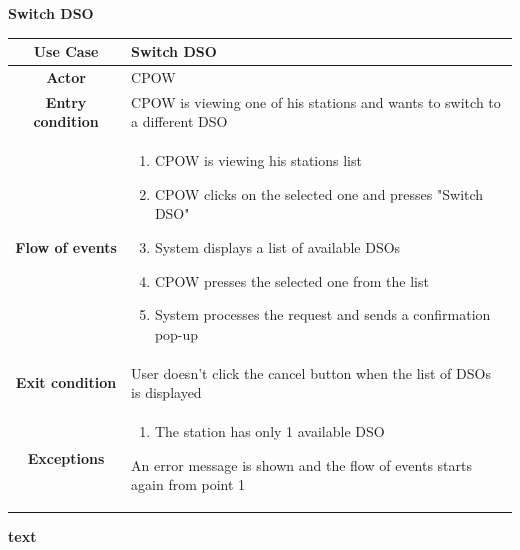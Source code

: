 \documentclass[table, 12pt]{article} %
\begin{document}
\begin{itemize}
             \begin{table}[H]
                \item[] \textbf{Switch DSO}
                \item[]
                \centering
                \begin{tabular}{|c |m{}|}
                    \hline
                    \textbf{Use Case} & Switch DSO\\ \hline
                    \textbf{Actor} & CPOW\\ \hline
                    \textbf{Entry condition} & CPOW is viewing one of his stations and wants to switch to a different DSO\\  \hline
                    \textbf{Flow of events} & \begin{enumerate}
                                                \item CPOW is viewing his stations list
                                                \item CPOW clicks on the selected one and presses "Switch DSO"
                                                \item System displays a list of available DSOs
                                                \item CPOW presses the selected one from the list
                                                \item System processes the request and sends a confirmation pop-up
                                            \end{enumerate}\\ \hline
                    \textbf{Exit condition} &  User doesn't click the cancel button when the list of DSOs is displayed\\ \hline
                    \textbf{Exceptions} &  \begin{enumerate}
                        \item The station has only 1 available DSO
                    \end{enumerate}
                    An error message is shown and the flow of events starts again from point 1\\ \hline
                \end{tabular}
            \end{table}







            \newpage
            \item \textbf{text}





\end{itemize}
\end{document}
